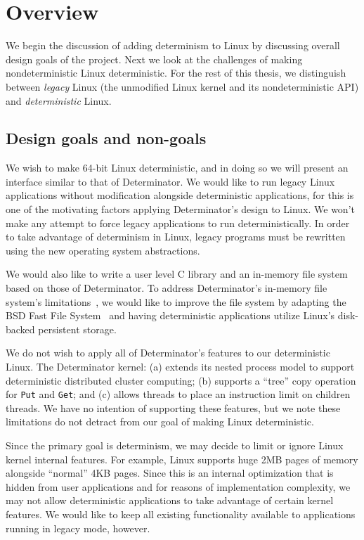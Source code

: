 
\section{Overview}
\label{sec:overview}

We begin the discussion of adding determinism to Linux by discussing overall
design goals of the project. Next we look at the challenges of making
nondeterministic Linux deterministic. For the rest of this thesis, we
distinguish between \emph{legacy} Linux (the unmodified Linux kernel and its
nondeterministic API) and \emph{deterministic} Linux.

\subsection{Design goals and non-goals}

We wish to make 64-bit Linux deterministic, and in doing so we will present an
interface similar to that of Determinator. We would like to run legacy
Linux applications without modification alongside deterministic applications,
for this is one of the motivating factors applying Determinator's design to
Linux. We won't make any attempt to force legacy applications to run
deterministically. In order to take advantage of determinism in
Linux, legacy programs must be rewritten using the new operating system
abstractions.

We would also like to write a user level C library and an in-memory file system
based on those of Determinator.
To address Determinator's in-memory file system's limitations~\cite{Aviram10,
Aviram10cloud}, we would like to improve the file system by adapting
the BSD Fast File System~\cite{mckusick1984fast} and having deterministic
applications utilize Linux's disk-backed persistent storage.

We do not wish to apply all of Determinator's features to our deterministic
Linux. The Determinator kernel: (a) extends its nested process model to support
deterministic distributed cluster computing; (b) supports a ``tree'' copy
operation for {\tt Put} and {\tt Get}; and (c) allows
threads to place an instruction limit on
children threads. We have no intention of supporting these features, but we note
these limitations do not detract from our goal of making Linux deterministic.

Since the primary goal is determinism, we may decide to limit or ignore Linux
kernel internal features. For example, Linux supports huge 2MB pages of memory
alongside ``normal'' 4KB pages. Since this is an internal optimization that is
hidden from user applications and for reasons of
implementation complexity, we may not allow deterministic applications to take
advantage of certain kernel features. We would like to keep all existing
functionality available to applications running in legacy mode, however.

